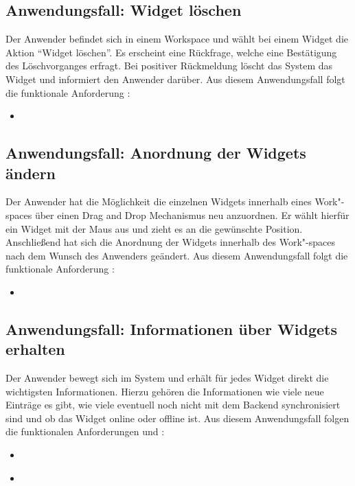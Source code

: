 \subsection{Anwendungsfall: Widget löschen}
Der Anwender befindet sich in einem Workspace und wählt bei einem Widget die Aktion "`Widget löschen"'. Es erscheint eine Rückfrage, welche eine Bestätigung des Löschvorganges erfragt. Bei positiver Rückmeldung löscht das System das Widget und informiert den Anwender darüber. Aus diesem Anwendungsfall folgt die funktionale Anforderung :
\begin{itemize}
 \item \requirementf{\requirementWidgetDelete}\label{requirementWidgetDelete}
\end{itemize}
 
\subsection{Anwendungsfall: Anordnung der Widgets ändern}
Der Anwender hat die Möglichkeit die einzelnen Widgets innerhalb eines Work"-spaces über einen Drag and Drop Mechanismus neu anzuordnen. Er wählt hierfür ein Widget mit der Maus aus und zieht es an die gewünschte Position. Anschließend hat sich die Anordnung der Widgets innerhalb des Work"-spaces nach dem Wunsch des Anwenders geändert. Aus diesem Anwendungsfall folgt die funktionale Anforderung :
\begin{itemize}
 \item \requirementf{\requirementWidgetSortDragNDrop}\label{requirementWidgetSortDragNDrop}
\end{itemize}

\subsection{Anwendungsfall: Informationen über Widgets erhalten}
Der Anwender bewegt sich im System und erhält für jedes Widget direkt die wichtigsten Informationen. Hierzu gehören die Informationen wie viele neue Einträge es gibt, wie viele eventuell noch nicht mit dem Backend synchronisiert sind und ob das Widget online oder offline ist. Aus diesem Anwendungsfall folgen die funktionalen Anforderungen  und :
\begin{itemize}
 \item \requirementf{\requirementWidgetInformSystem}\label{requirementWidgetInformSystem}
 \item \requirementf{\requirementWidgetInformUser}\label{requirementWidgetInformUser}
\end{itemize}

